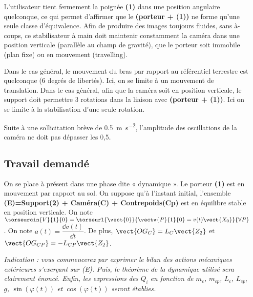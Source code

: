 L’utilisateur tient fermement la poignée \textbf{(1)} dans une position angulaire quelconque, ce qui permet d’affirmer que le \textbf{(porteur + (1))} ne forme qu’une seule classe d’équivalence.
Afin de produire des images toujours fluides, sans à-coups, ce
stabilisateur à main doit maintenir constamment la caméra dans
une position verticale (parallèle au champ de
gravité), que le porteur soit immobile (plan fixe) ou en
mouvement (travelling).

Dans le cas général, le mouvement du bras par rapport au référentiel terrestre est quelconque (6 degrés de libertés). Ici, on se limite à un mouvement de translation. Dans le cas général, afin que la caméra soit en position verticale, le support doit permettre 3 rotations dans la liaison avec \textbf{(porteur + (1))}. Ici on se limite à la stabilisation d'une seule rotation. 
 \fi
\begin{obj}
Suite à une sollicitation brève de \SI{0,5}{m.s^{-2}}, l'amplitude des oscillations de la caméra ne doit pas dépasser les 0,5\degres.
\end{obj}

\subsection*{Travail demandé}
\ifprof
\else
On se place à présent dans une phase dite « dynamique ». Le porteur \textbf{(1)} est en mouvement par rapport au sol. On suppose qu'à l'instant initial, l'ensemble \textbf{(E)=Support(2) + Caméra(C) + Contrepoids(Cp)} est en équilibre stable en position verticale. On note $\torseurcin{V}{1}{0}=\torseurl{\vect{0}}{\vectv{P}{1}{0}=v(t)\vect{X_0}}{\forall P}$.
On note $a(t)=\dfrac{\dd v(t)}{\dd t}$. De plus, $\vect{OG_C}=L_C\vect{Z_2}$ et $\vect{OG_{CP}}=-L_{CP}\vect{Z_2}$.
\fi


\ifdifficile
\ifprof
\else
\textit{Indication : vous commencerez par exprimer le bilan des actions mécaniques extérieures s’exerçant sur (E). Puis,
le théorème de la dynamique utilisé sera clairement énoncé. Enfin, les expressions des $Q_i$ en fonction de $m_c$,
$m_{cp}$, $L_c$, $L_{cp}$, $g$, $\sin\left(\varphi(t)\right)$ et $\cos\left(\varphi(t)\right)$ seront établies.}
\fi

\else
\fi



